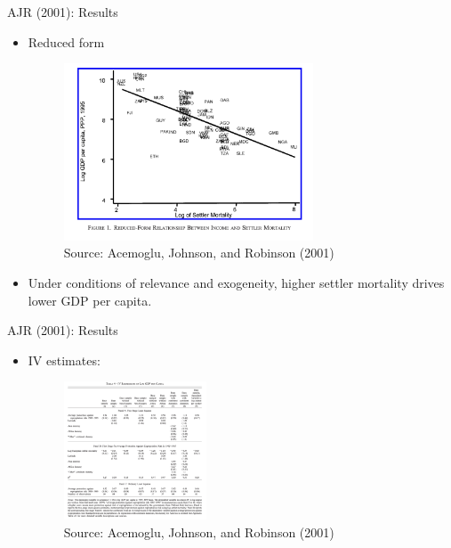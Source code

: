 \documentclass[11pt,notes=hide,aspectratio=169,mathserif]{beamer}
\begin{document}
\begin{frame}{AJR (2001): Results}
\begin{itemize}
\item Reduced form
\begin{figure}
\centering
\includegraphics[width=0.7\textwidth]{inputs/AJR3.png}
\caption{Source: Acemoglu, Johnson, and Robinson (2001)}
\end{figure}
\item Under conditions of relevance and exogeneity, higher settler mortality drives lower GDP per capita. 
\end{itemize}
\end{frame}

\begin{frame}{AJR (2001): Results}
\begin{itemize}
\item IV estimates:
\begin{figure}
\centering
\includegraphics[width=0.4\textwidth]{inputs/AJR4.png}
\caption{Source: Acemoglu, Johnson, and Robinson (2001)}
\end{figure}
\end{itemize}
\end{frame}
\end{document}
